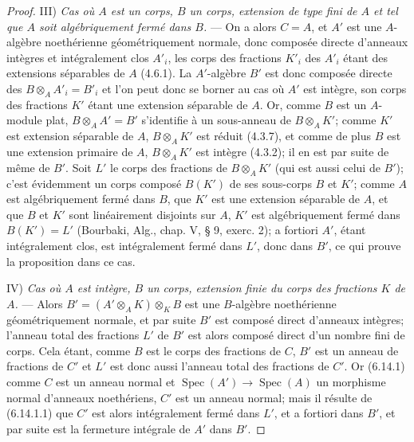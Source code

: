 \begin{proof}
III) \emph{Cas où $A$ est un corps, $B$ un corps, extension de type fini de
$A$ et tel que $A$ soit algébriquement fermé dans $B$.} --- On a alors
$C=A$, et $A'$ est une $A$-algèbre noethérienne géométriquement normale,
donc composée directe d'anneaux intègres et intégralement clos $A'_i$, les
corps des fractions $K'_i$ des $A'_i$ étant des extensions séparables de
$A$ (4.6.1). La $A'$-algèbre $B'$ est donc composée directe des
$B\otimes_A A'_i=B'_i$ et l'on peut donc se borner au cas où $A'$ est
intègre, son corps des fractions $K'$ étant une extension séparable de $A$.
Or, comme $B$ est un $A$-module plat, $B\otimes_A A'=B'$ s'identifie à un
sous-anneau de $B\otimes_A K'$; comme $K'$ est extension séparable de $A$,
$B\otimes_A K'$ est réduit (4.3.7), et comme de plus $B$ est une extension
primaire de $A$, $B\otimes_A K'$ est intègre (4.3.2); il en est par suite
de même de $B'$. Soit $L'$ le corps des fractions de $B\otimes_A K'$ (qui
est aussi celui de $B'$); c'est évidemment un corps composé $B(K')$ de ses
sous-corps $B$ et $K'$; comme $A$ est algébriquement fermé dans $B$, que
$K'$ est une extension séparable de $A$, et que $B$ et $K'$ sont
linéairement disjoints sur $A$, $K'$ est algébriquement fermé dans
$B(K')=L'$ (Bourbaki, Alg., chap. V, § 9, exerc. 2); a fortiori $A'$, étant
intégralement clos, est intégralement fermé dans $L'$, donc dans $B'$, ce
qui prouve la proposition dans ce cas.

IV) \emph{Cas où $A$ est intègre, $B$ un corps, extension finie du corps
des fractions $K$ de $A$.} --- Alors
$B'=(A'\otimes_A K)\otimes_K B$ est une $B$-algèbre noethérienne
géométriquement normale, et par suite $B'$ est composé direct d'anneaux
intègres; l'anneau total des fractions $L'$ de $B'$ est alors composé
direct d'un nombre fini de corps. Cela étant, comme $B$ est le corps des
fractions de $C$, $B'$ est un anneau de fractions de $C'$ et $L'$ est donc
aussi l'anneau total des fractions de $C'$. Or (6.14.1) comme $C$ est un
anneau normal et $\operatorname{Spec}(A')\to\operatorname{Spec}(A)$ un
morphisme normal d'anneaux noethériens, $C'$ est un anneau normal; mais il
résulte de (6.14.1.1) que $C'$ est alors intégralement fermé dans $L'$, et
a fortiori dans $B'$, et par suite est la fermeture intégrale de $A'$ dans
$B'$.


\end{proof}
